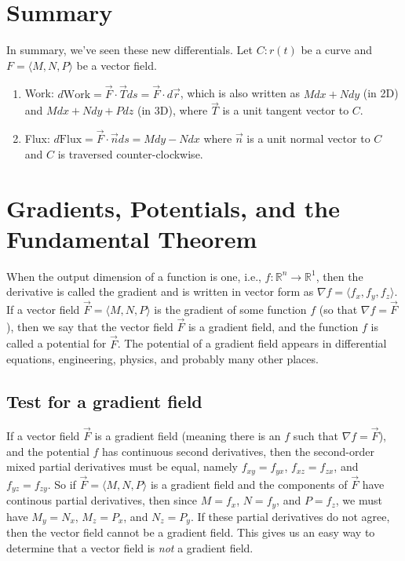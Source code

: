 \section{Summary}
\label{sec:summary}

In summary, we've seen these new differentials.    Let $C\colon r(t)$ be a curve and
$F=\langle M,N,P\rangle$ be a vector field.
\begin{enumerate}
\item Work: $d\text{Work} = \vec F\cdot \vec T ds = \vec F\cdot d\vec r$, which is also written as $Mdx+Ndy$ (in 2D) and $Mdx+Ndy+Pdz$ (in 3D), where $\vec T$ is
a unit tangent vector to $C$.
\item Flux: $d\text{Flux} = \vec F\cdot \vec n ds = Mdy-Ndx$ where $\vec
n$ is a unit normal vector to $C$ and $C$ is traversed counter-clockwise.
\end{enumerate}

\section{Gradients, Potentials, and the Fundamental Theorem}

When the output dimension of a function is one, {i.e.,
  $f\colon{\mathbb{R}}^n\to {\mathbb{R}}^1$}, then the derivative is called
the gradient and is written in vector form as {$\nabla f = \langle f_x,f_y,f_z\rangle$}.
If a vector field {$\vec F = \langle M,N,P\rangle$} is the gradient of some
function {$f$} (so that {$\nabla f= \vec F$}), then we say that the vector
field {$\vec F$} is a gradient field, and the function {$f$} is called
a potential for {$\vec F$}. The potential of a gradient field appears
in differential equations, engineering, physics, and probably many
other places.

\subsection{Test for a gradient field}

If a vector field $\vec F$ is a gradient field (meaning there is an
$f$ such that $\nabla f=\vec F$), and the potential $f$ has continuous
second derivatives, then the second-order mixed partial derivatives
must be equal, namely $f_{xy}=f_{yx}$, $f_{xz}=f_{zx}$, and
$f_{yz}=f_{zy}$. So if $\vec F = \langle M,N,P\rangle$ is a gradient field and the
components of $\vec F$ have continous partial derivatives, then since
$M=f_x$, $N=f_y$, and $P=f_z$, we must have $M_y=N_x$, $M_z=P_x$, and
$N_z=P_y$. If these partial derivatives do not agree, then the vector
field cannot be a gradient field.  This gives us an easy way to
determine that a vector field is \emph{not} a gradient field.


